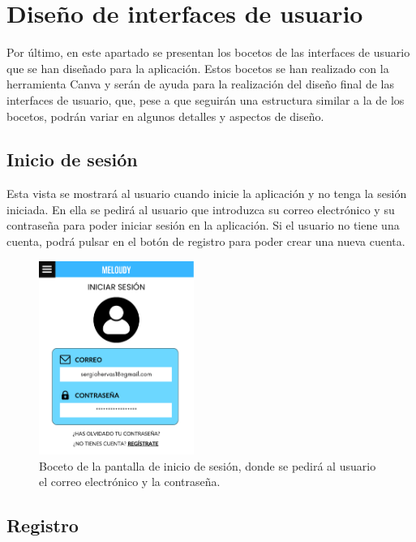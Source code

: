 \newpage
\section{Diseño de interfaces de usuario}
Por último, en este apartado se presentan los bocetos de las interfaces de usuario que se han diseñado para la aplicación. Estos bocetos se han realizado con la herramienta Canva y serán de ayuda para la realización del diseño final de las interfaces de usuario,
que, pese a que seguirán una estructura similar a la de los bocetos, podrán variar en algunos detalles y aspectos de diseño.
\\

\subsection*{Inicio de sesión}

Esta vista se mostrará al usuario cuando inicie la aplicación y no tenga la sesión iniciada. En ella se pedirá al usuario que introduzca su correo electrónico y su contraseña para poder iniciar sesión en la aplicación. Si el usuario no tiene una cuenta, podrá pulsar en el botón de registro para poder crear una nueva cuenta.

\begin{figure}[H]
    \centering
    \centerline{\includegraphics[width=0.45\textwidth, frame]{imagenes/c6/9.png}}
    \caption{Boceto de la pantalla de inicio de sesión, donde se pedirá al usuario el correo electrónico y la contraseña.}
    \label{fig:login}
\end{figure}


\subsection*{Registro}

